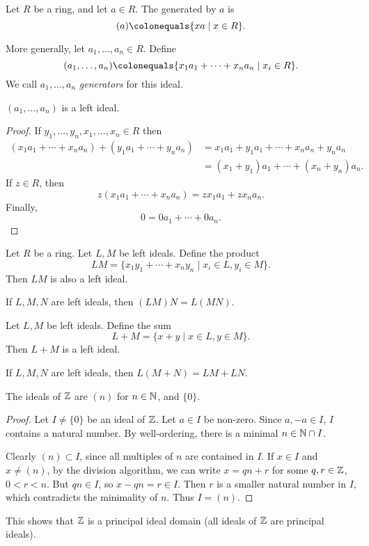 \begin{definition}
Let $R$ be a ring, and let $a\in R$. The  generated by $a$ is
\[(a)\colonequals\{xa\mid x\in R\}.\] 
\end{definition}

More generally, let $a_1,\dots,a_n\in R$. Define 
\[(a_1,\dots,a_n)\colonequals\{x_1a_1+\cdots+x_na_n\mid x_i\in R\}.\]
We call $a_1,\dots,a_n$ \emph{generators} for this ideal.

\begin{lemma*}
$(a_1,\dots,a_n)$ is a left ideal.
\end{lemma*}

\begin{proof}
If $y_1,\dots,y_n,x_1,\dots,x_n\in R$ then
\begin{align*}
(x_1a_1+\cdots+x_na_n)+(y_1a_1+\cdots+y_na_n)
&=x_1a_1+y_1a_1+\cdots+x_na_n+y_na_n\\
&=(x_1+y_1)a_1+\cdots+(x_n+y_n)a_n.
\end{align*}
If $z\in R$, then
\[z(x_1a_1+\cdots+x_na_n)=zx_1a_1+zx_na_n.\]
Finally,
\[0=0a_1+\cdots+0a_n.\]
\end{proof}

\begin{example}
Let $R$ be a ring. Let $L, M$ be left ideals. Define the product
\[LM=\{x_1y_1+\cdots+x_ny_n\mid x_i\in L,y_i\in M\}.\]
Then $LM$ is also a left ideal.

If $L, M, N$ are left ideals, then $(LM)N=L(MN)$.
\end{example}

\begin{example}
Let $L, M$ be left ideals. Define the sum
\[L+M=\{x+y\mid x\in L,y\in M\}.\]
Then $L+M$ is a left ideal. 

If $L,M,N$ are left ideals, then $L(M+N)=LM+LN$. 
\end{example}

\begin{example}
The ideals of $\mathbb Z$ are $(n)$ for $n\in\mathbb N$, and $\{0\}$.
\begin{proof}
Let $I\neq\{0\}$ be an ideal of $\mathbb Z$. Let $a\in I$ be non-zero. Since $a,-a\in I$, $I$ contains a natural number. By well-ordering, there is a minimal $n\in\mathbb N\cap I$.

Clearly $(n)\subset I$, since all multiples of $n$ are contained in $I$. If $x\in I$ and $x\neq(n)$, by the division algorithm, we can write $x=qn+r$ for some $q,r\in\mathbb Z$, $0<r<n$. But $qn\in I$, so $x-qn=r\in I$. Then $r$ is a smaller natural number in $I$, which contradicts the minimality of $n$. Thus $I=(n)$.
\end{proof}
This shows that $\mathbb Z$ is a principal ideal domain (all ideals of $\mathbb Z$ are principal ideals).
\end{example}

